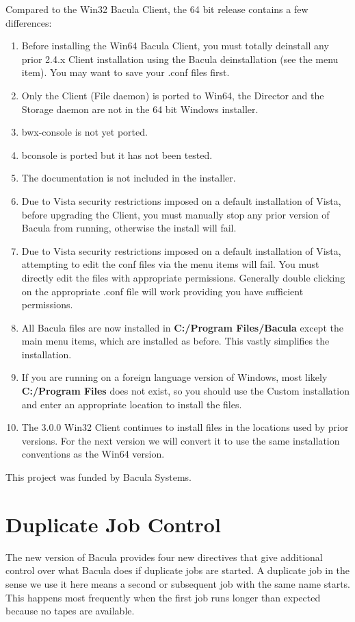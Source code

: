 Compared to the Win32 Bacula Client, the 64 bit release contains a few differences:
\begin{enumerate}
\item Before installing the Win64 Bacula Client, you must totally
      deinstall any prior 2.4.x Client installation using the 
      Bacula deinstallation (see the menu item). You may want
      to save your .conf files first.
\item Only the Client (File daemon) is ported to Win64, the Director
      and the Storage daemon are not in the 64 bit Windows installer.
\item bwx-console is not yet ported.
\item bconsole is ported but it has not been tested.
\item The documentation is not included in the installer.
\item Due to Vista security restrictions imposed on a default installation
      of Vista, before upgrading the Client, you must manually stop
      any prior version of Bacula from running, otherwise the install
      will fail.
\item Due to Vista security restrictions imposed on a default installation
      of Vista, attempting to edit the conf files via the menu items
      will fail. You must directly edit the files with appropriate 
      permissions.  Generally double clicking on the appropriate .conf
      file will work providing you have sufficient permissions.
\item All Bacula files are now installed in 
      {\bf C:/Program Files/Bacula} except the main menu items,
      which are installed as before. This vastly simplifies the installation.
\item If you are running on a foreign language version of Windows, most
      likely {\bf C:/Program Files} does not exist, so you should use the
      Custom installation and enter an appropriate location to install
      the files.
\item The 3.0.0 Win32 Client continues to install files in the locations used
      by prior versions. For the next version we will convert it to use
      the same installation conventions as the Win64 version.
\end{enumerate}

This project was funded by Bacula Systems.


\section{Duplicate Job Control}
The new version of Bacula provides four new directives that
give additional control over what Bacula does if duplicate jobs 
are started.  A duplicate job in the sense we use it here means
a second or subsequent job with the same name starts.  This
happens most frequently when the first job runs longer than expected because no 
tapes are available.

